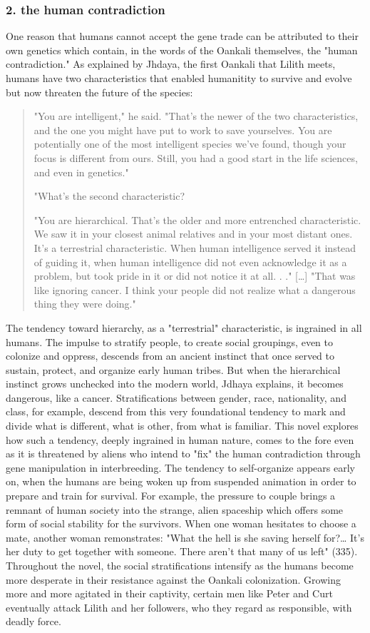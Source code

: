 \documentclass[11pt]{article}
\begin{document}
\subsubsection{2. the human contradiction}
\label{sec:org61dea06}
One reason that humans cannot accept the gene trade can be attributed
to their own genetics which contain, in the words of the Oankali
themselves, the "human contradiction." As explained by Jhdaya, the
first Oankali that Lilith meets, humans have two characteristics that
enabled humanitity to survive and evolve but now threaten the future
of the species:
\begin{quote}
"You are intelligent," he said. "That's the newer of the two
characteristics, and the one you might have put to work to save
yourselves. You are potentially one of the most intelligent species
we've found, though your focus is different from ours. Still, you had
a good start in the life sciences, and even in genetics."

"What's the second characteristic?  

"You are hierarchical. That's the older and more entrenched
characteristic. We saw it in your closest animal relatives and in your
most distant ones. It's a terrestrial characteristic. When human
intelligence served it instead of guiding it, when human intelligence
did not even acknowledge it as a problem, but took pride in it or did
not notice it at all. . ." [\ldots{}] "That was like ignoring cancer. I
think your people did not realize what a dangerous thing they were
doing."
\end{quote}
The tendency toward hierarchy, as a "terrestrial" characteristic, is
ingrained in all humans. The impulse to stratify people, to create
social groupings, even to colonize and oppress, descends from an
ancient instinct that once served to sustain, protect, and organize
early human tribes. But when the hierarchical instinct grows unchecked
into the modern world, Jdhaya explains, it becomes dangerous, like a
cancer. Stratifications between gender, race, nationality, and class,
for example, descend from this very foundational tendency to mark and
divide what is different, what is other, from what is familiar. This
novel explores how such a tendency, deeply ingrained in human nature,
comes to the fore even as it is threatened by aliens who intend to
"fix" the human contradiction through gene manipulation in
interbreeding. The tendency to self-organize appears early on, when
the humans are being woken up from suspended animation in order to
prepare and train for survival. For example, the pressure to couple
brings a remnant of human society into the strange, alien spaceship
which offers some form of social stability for the survivors. When one
woman hesitates to choose a mate, another woman remonstrates: "What
the hell is she saving herself for?\ldots{} It's her duty to get together
with someone. There aren't that many of us left" (335). Throughout the
novel, the social stratifications intensify as the humans become more
desperate in their resistance against the Oankali
colonization. Growing more and more agitated in their captivity,
certain men like Peter and Curt eventually attack Lilith and her
followers, who they regard as responsible, with deadly force.
\end{document}
